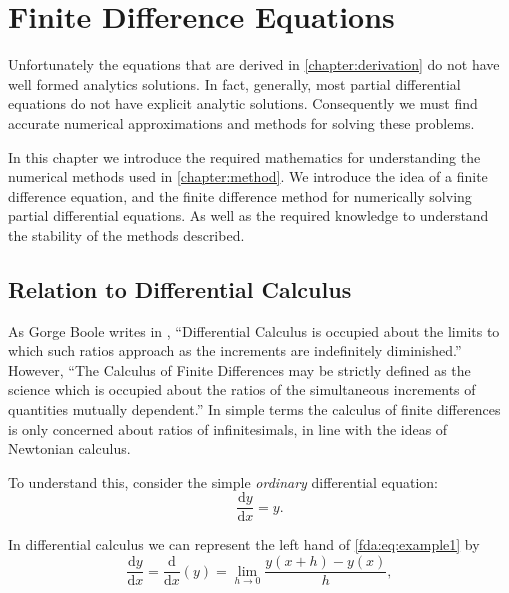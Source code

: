 \documentclass[../main.tex]{subfiles}
\begin{document}
  \chapter{Finite Difference Equations}\label{chapter:fdes}

  Unfortunately the equations that are derived in \autoref{chapter:derivation} do not have well formed analytics solutions. In fact, generally, most partial differential equations do not have explicit analytic solutions. Consequently we must find accurate numerical approximations and methods for solving these problems.

  In this chapter we introduce the required mathematics for understanding the numerical methods used in \autoref{chapter:method}. We introduce the idea of a finite difference equation, and the finite difference method for numerically solving partial differential equations. As well as the required knowledge to understand the stability of the methods described.

  \section{Relation to Differential Calculus}\label{sec:fdes:intro}
  As Gorge Boole writes in \cite{boole1880}, ``Differential Calculus is occupied about the limits to which such ratios approach as the increments are indefinitely diminished.'' However, ``The Calculus of Finite Differences may be strictly defined as the science which is occupied about the ratios of the simultaneous increments of quantities mutually dependent.'' In simple terms the calculus of finite differences is only concerned about ratios of infinitesimals, in line with the ideas of Newtonian calculus. \par

  To understand this, consider the simple \emph{ordinary} differential equation: \\

  \begin{equation}\label{fda:eq:example1}
    \frac{\mathrm{d}y}{\mathrm{d}x} = y.
  \end{equation}

  In differential calculus we can represent the left hand of \autoref{fda:eq:example1} by \\

  \begin{equation}
    \frac{\mathrm{d}y}{\mathrm{d}x} = \frac{\mathrm{d}}{\mathrm{d}x}(y) = \lim_{h \to 0} \frac{y(x+h) - y(x)}{h},
  \end{equation}
\end{document}

